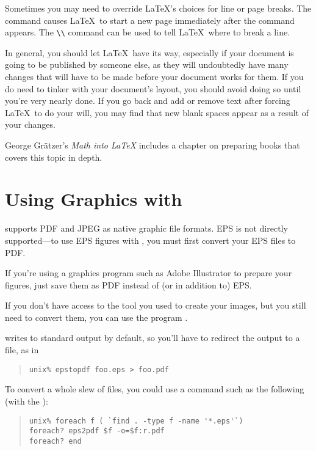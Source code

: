 Sometimes you may need to override \LaTeX's choices for line or page
breaks.  The  command causes \LaTeX\ to start a new
page immediately after the command appears.  The \verb|\\| command can
be used to tell \LaTeX\ where to break a line.

In general, you should let \LaTeX\ have its way, especially if your
document is going to be published by someone else, as they will
undoubtedly have many changes that will have to be made before your
document works for them.  If you do need to tinker with your
document's layout, you should avoid doing so until you're very nearly
done.  If you go back and add or remove text after forcing \LaTeX\ to
do your will, you may find that new blank spaces appear as a result of
your changes.

George Gr\"{a}tzer's \emph{Math into \LaTeX} \citeyearpar{gratzer-mil}
includes a chapter on preparing books that covers this topic in depth.


\section{Using Graphics with \pdftex}%
\label{sec:pdftex-graphics}

\pdftex supports PDF and JPEG as native graphic file formats.  EPS is
not directly supported---to use EPS figures with \pdftex, you must
first convert your EPS files to PDF.  

If you're using a graphics program such as Adobe Illustrator to
prepare your figures, just save them as PDF instead of (or in addition
to) EPS.

If you don't have access to the tool you used to create your images,
but you still need to convert them, you can use the program
.

 writes to standard output by default, so you'll have
to redirect the output to a file, as in
\begin{quote}
\begin{verbatim}
unix% epstopdf foo.eps > foo.pdf
\end{verbatim}
\end{quote}

To convert a whole slew of files, you could use a command such as the
following (with the ):
\begin{quote}
\begin{verbatim}
unix% foreach f ( `find . -type f -name '*.eps'`)
foreach? eps2pdf $f -o=$f:r.pdf
foreach? end
\end{verbatim}
\end{quote}


